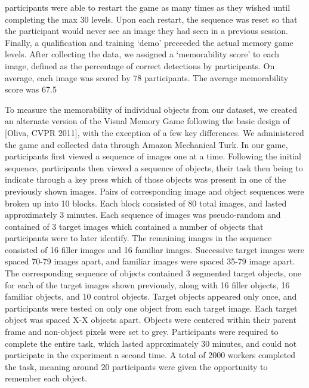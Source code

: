 participants were able to restart the game as many times as they wished until completing the max 30 levels. Upon each restart, the sequence was reset so that the participant
would never see an image they had seen in a previous session. Finally, a qualification and training ‘demo’ preceeded the actual memory game levels. After collecting the data, we assigned a ‘memorability score’ to each image, defined as the percentage of correct detections by participants. On average, each image was scored by 78 participants. The average memorability score
was 67.5%



To measure the memorability of individual objects from our dataset, we created an alternate version of the Visual Memory Game following the basic design of [Oliva, CVPR 2011], with the exception of a few key differences. We administered the game and collected data through Amazon Mechanical Turk. In our game, participants first viewed a sequence of images one at a time. Following the initial sequence, participants then viewed a sequence of objects, their task then being to indicate through a key press which of those objects was present in one of the previously shown images. Pairs of corresponding image and object sequences were broken up into 10 blocks. Each block consisted of 80 total images, and lasted approximately 3 minutes. Each sequence of images was pseudo-random and contained of 3 target images which contained a number of objects that participants were to later identify. The remaining images in the sequence consisted of 16 filler images and 16 familiar images. Successive target images were spaced 70-79 images apart, and familiar images were spaced 35-79 image apart. The corresponding sequence of objects contained 3 segmented target objects, one for each of the target images shown previously, along with 16 filler objects, 16 familiar objects, and 10 control objects. Target objects appeared only once, and participants were tested on only one object from each target image. Each target object was spaced X-X objects apart. Objects were centered within their parent frame and non-object pixels were set to grey. Participants were required to complete the entire task, which lasted approximately 30 minutes, and could not participate in the experiment a second time. A total of 2000 workers completed the task, meaning around 20 participants were given the opportunity to remember each object. 